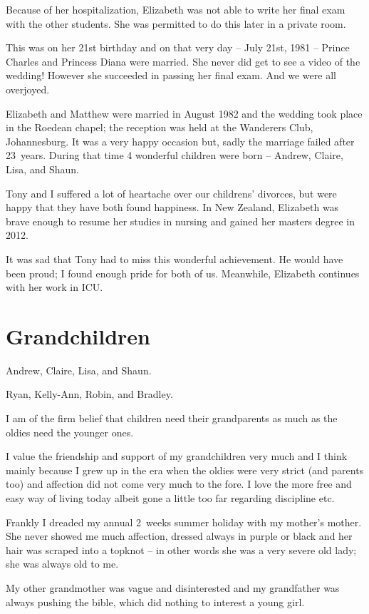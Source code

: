 Because of her hospitalization, Elizabeth was not able to write her
final exam with the other students. She was permitted to do this later
in a private room.

This was on her 21st birthday and on that very day -- July 21st, 1981
-- Prince Charles and Princess Diana were married. She never did get
to see a video of the wedding! However she succeeded in passing her
final exam. And we were all overjoyed.

Elizabeth and Matthew were married in August 1982 and the wedding took
place in the Roedean chapel; the reception was held at the Wanderers
Club, Johannesburg. It was a very happy occasion but, sadly the
marriage failed after 23~years. During that time 4 wonderful children
were born -- Andrew, Claire, Lisa, and Shaun.

Tony and I suffered a lot of heartache over our childrens' divorces,
but were happy that they have both found happiness. In New Zealand,
Elizabeth was brave enough to resume her studies in nursing and gained
her masters degree in 2012.

It was sad that Tony had to miss this wonderful achievement. He would
have been proud; I found enough pride for both of us. Meanwhile,
Elizabeth continues with her work in ICU.


\chapter{Grandchildren}

Andrew, Claire, Lisa, and Shaun.

Ryan, Kelly-Ann, Robin, and Bradley.

I am of the firm belief that children need their grandparents as much
as the oldies need the younger ones.

I value the friendship and support of my grandchildren very much and I
think mainly because I grew up in the era when the oldies were very
strict (and parents too) and affection did not come very much to the
fore. I love the more free and easy way of living today albeit gone a
little too far regarding discipline etc.

Frankly I dreaded my annual 2~weeks summer holiday with my mother's
mother. She never showed me much affection, dressed always in purple
or black and her hair was scraped into a topknot -- in other words she
was a very severe old lady; she was always old to me.

My other grandmother was vague and disinterested and my grandfather
was always pushing the bible, which did nothing to interest a young
girl.

